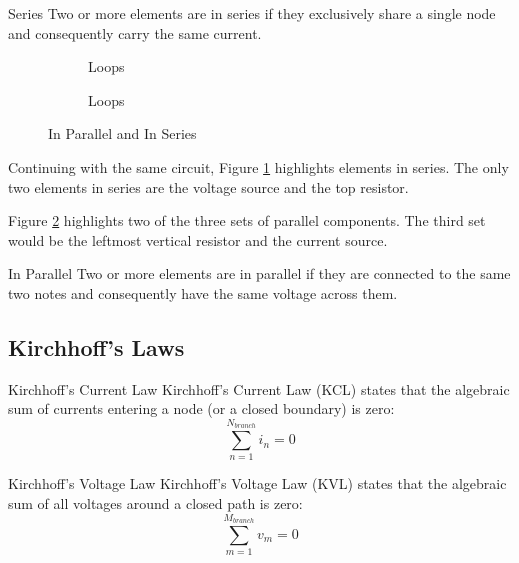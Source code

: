 \documentclass[12pt]{article}
\begin{document}
\begin{definition}{Series}
  Two or more elements are in series if they exclusively share a single node and consequently carry the same current.
\end{definition}

\begin{figure}[H]
  \centering
  \begin{subfigure}[H]{0.45\textwidth}
    \centering
    
    \caption{Loops}
    \label{fig:009}
  \end{subfigure}
  \begin{subfigure}[H]{0.45\textwidth}
    \centering
    
    \caption{Loops}
    \label{fig:010}
  \end{subfigure}
  \caption{In Parallel and In Series}
  \label{fig:inParallelAndInSeries}
\end{figure}

Continuing with the same circuit, Figure \ref{fig:009} highlights elements in series. The only two elements in series are the voltage source and the top resistor.

Figure \ref{fig:010} highlights two of the three sets of parallel components. The third set would be the leftmost vertical resistor and the current source.

\begin{definition}{In Parallel}
  Two or more elements are in parallel if they are connected to the same two notes and consequently have the same voltage across them.
\end{definition}

\subsection{Kirchhoff's Laws}
\label{ssec:kirchoffsLaws}

\begin{definition}{Kirchhoff's Current Law}
  Kirchhoff's Current Law (KCL) states that the algebraic sum of currents entering a node (or a closed boundary) is zero:
  \begin{equation*}
    \sum_{n=1}^{N_{branch}} i_n = 0
  \end{equation*}
\end{definition}

\begin{definition}{Kirchhoff's Voltage Law}
  Kirchhoff's Voltage Law (KVL) states that the algebraic sum of all voltages around a closed path is zero:
  \begin{equation*}
    \sum_{m=1}^{M_{branch}} v_m = 0
  \end{equation*}
\end{definition}
\end{document}
